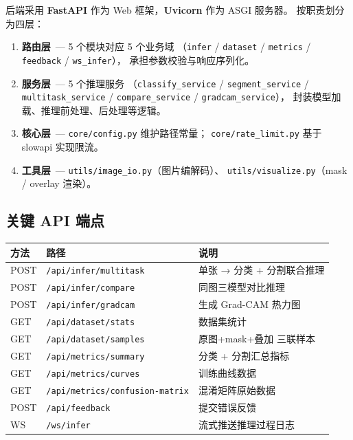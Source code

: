 \documentclass[12pt, a4paper, openany]{ctexbook}
\begin{document}
后端采用 \textbf{FastAPI} 作为 Web 框架，\textbf{Uvicorn} 作为 ASGI 服务器。
按职责划分为四层：

\begin{enumerate}[leftmargin=*]
  \item \textbf{路由层}\ — 5 个模块对应 5 个业务域
        （\texttt{infer} / \texttt{dataset} / \texttt{metrics} / \texttt{feedback} / \texttt{ws\_infer}），
        承担参数校验与响应序列化。
  \item \textbf{服务层}\ — 5 个推理服务
        （\texttt{classify\_service} / \texttt{segment\_service} / \texttt{multitask\_service} /
        \texttt{compare\_service} / \texttt{gradcam\_service}），
        封装模型加载、推理前处理、后处理等逻辑。
  \item \textbf{核心层}\ — \texttt{core/config.py} 维护路径常量；
        \texttt{core/rate\_limit.py} 基于 slowapi 实现限流。
  \item \textbf{工具层}\ — \texttt{utils/image\_io.py}（图片编解码）、
        \texttt{utils/visualize.py}（mask / overlay 渲染）。
\end{enumerate}

\subsection{关键 API 端点}

\begin{center}
\footnotesize
\begin{tabular}{llL{5.5cm}}
  \toprule
  \textbf{方法} & \textbf{路径} & \textbf{说明} \\
  \midrule
  POST & \texttt{/api/infer/multitask}  & 单张 → 分类 + 分割联合推理 \\
  POST & \texttt{/api/infer/compare}    & 同图三模型对比推理 \\
  POST & \texttt{/api/infer/gradcam}    & 生成 Grad-CAM 热力图 \\
  GET  & \texttt{/api/dataset/stats}    & 数据集统计 \\
  GET  & \texttt{/api/dataset/samples}  & 原图+mask+叠加 三联样本 \\
  GET  & \texttt{/api/metrics/summary}  & 分类 + 分割汇总指标 \\
  GET  & \texttt{/api/metrics/curves}   & 训练曲线数据 \\
  GET  & \texttt{/api/metrics/confusion-matrix} & 混淆矩阵原始数据 \\
  POST & \texttt{/api/feedback}         & 提交错误反馈 \\
  WS   & \texttt{/ws/infer}             & 流式推送推理过程日志 \\
  \bottomrule
\end{tabular}
\end{center}
\end{document}
